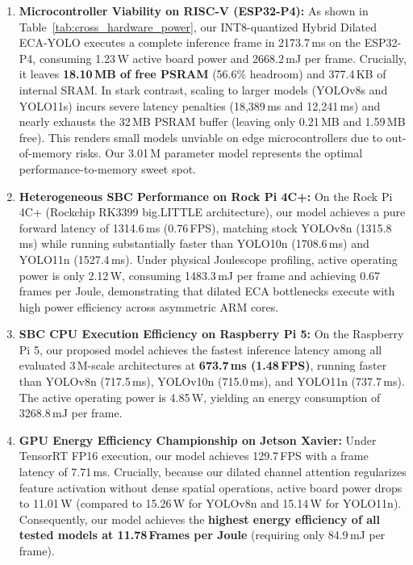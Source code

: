 \documentclass[journal,twoside,web]{ieeecolor}
\begin{document}
\begin{enumerate}
    \item \textbf{Microcontroller Viability on RISC-V (ESP32-P4):} As shown in Table~\ref{tab:cross_hardware_power}, our INT8-quantized Hybrid Dilated ECA-YOLO executes a complete inference frame in 2173.7\,ms on the ESP32-P4, consuming 1.23\,W active board power and 2668.2\,mJ per frame. Crucially, it leaves \textbf{18.10\,MB of free PSRAM} (56.6\% headroom) and 377.4\,KB of internal SRAM. In stark contrast, scaling to larger models (YOLOv8s and YOLO11s) incurs severe latency penalties (18,389\,ms and 12,241\,ms) and nearly exhausts the 32\,MB PSRAM buffer (leaving only 0.21\,MB and 1.59\,MB free). This renders small models unviable on edge microcontrollers due to out-of-memory risks. Our 3.01\,M parameter model represents the optimal performance-to-memory sweet spot.
    \item \textbf{Heterogeneous SBC Performance on Rock Pi 4C+:} On the Rock Pi 4C+ (Rockchip RK3399 big.LITTLE architecture), our model achieves a pure forward latency of 1314.6\,ms (0.76\,FPS), matching stock YOLOv8n (1315.8\,ms) while running substantially faster than YOLO10n (1708.6\,ms) and YOLO11n (1527.4\,ms). Under physical Joulescope profiling, active operating power is only 2.12\,W, consuming 1483.3\,mJ per frame and achieving 0.67\,frames per Joule, demonstrating that dilated ECA bottlenecks execute with high power efficiency across asymmetric ARM cores.
    \item \textbf{SBC CPU Execution Efficiency on Raspberry Pi 5:} On the Raspberry Pi 5, our proposed model achieves the fastest inference latency among all evaluated 3\,M-scale architectures at \textbf{673.7\,ms (1.48\,FPS)}, running faster than YOLOv8n (717.5\,ms), YOLOv10n (715.0\,ms), and YOLO11n (737.7\,ms). The active operating power is 4.85\,W, yielding an energy consumption of 3268.8\,mJ per frame.
    \item \textbf{GPU Energy Efficiency Championship on Jetson Xavier:} Under TensorRT FP16 execution, our model achieves 129.7\,FPS with a frame latency of 7.71\,ms. Crucially, because our dilated channel attention regularizes feature activation without dense spatial operations, active board power drops to 11.01\,W (compared to 15.26\,W for YOLOv8n and 15.14\,W for YOLO11n). Consequently, our model achieves the \textbf{highest energy efficiency of all tested models at 11.78\,Frames per Joule} (requiring only 84.9\,mJ per frame).
\end{enumerate}
\end{document}
